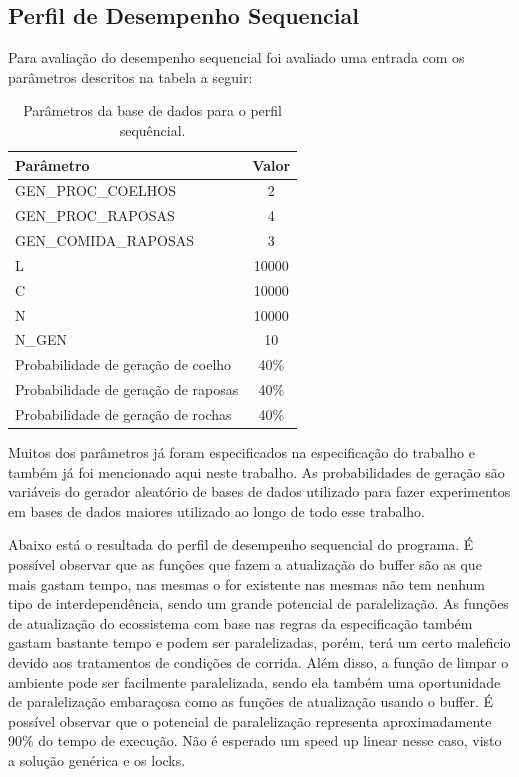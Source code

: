 \documentclass{article}
\begin{document}
\subsection{Perfil de Desempenho Sequencial}

Para avaliação do desempenho sequencial foi avaliado uma entrada com os parâmetros descritos na tabela a seguir:


\begin{table}[H]
	\begin{center}
		\begin{tabular}{|l|c|}
			\hline
			Parâmetro                           & Valor \\
			\hline
			GEN\_PROC\_COELHOS                  & 2     \\
			GEN\_PROC\_RAPOSAS                  & 4     \\
			GEN\_COMIDA\_RAPOSAS                & 3     \\
			L                                   & 10000 \\
			C                                   & 10000 \\
			N                                   & 10000 \\
			N\_GEN                              & 10    \\\hline
			Probabilidade de geração de coelho  & 40\%  \\
			Probabilidade de geração de raposas & 40\%  \\
			Probabilidade de geração de rochas  & 40\%  \\
			\hline
		\end{tabular}
	\end{center}
	\caption{Parâmetros da base de dados para o perfil sequêncial.}
	\label{tab:parametros_base_de_dados_perfil_sequencial}
\end{table}

Muitos dos parâmetros já foram especificados na especificação do trabalho e também já foi mencionado aqui neste trabalho. As probabilidades de geração são variáveis do gerador aleatório de bases de dados utilizado para fazer experimentos em bases de dados maiores utilizado ao longo de todo esse trabalho.


Abaixo está o resultada do perfil de desempenho sequencial do programa. É possível observar que as funções que fazem a atualização do buffer são as que mais gastam tempo, nas mesmas o for existente nas mesmas não tem nenhum tipo de interdependência, sendo um grande potencial de paralelização. As funções de atualização do ecossistema com base nas regras da especificação também gastam bastante tempo e podem ser paralelizadas, porém, terá um certo maleficio devido aos tratamentos de condições de corrida. Além disso, a função de limpar o ambiente pode ser facilmente paralelizada, sendo ela também uma oportunidade de paralelização embaraçosa como as funções de atualização usando o buffer. É possível observar que o potencial de paralelização representa aproximadamente 90\% do tempo de execução. Não é esperado um speed up linear nesse caso, visto a solução genérica e os locks.
\end{document}
